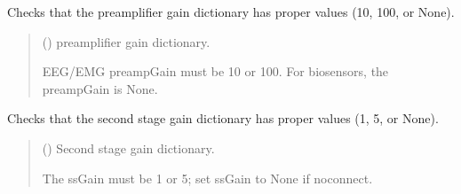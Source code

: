 \documentclass[letterpaper,10pt,english]{sphinxmanual}
\begin{document}
\begin{fulllineitems}
\begin{fulllineitems}
\label{\detokenize{Morelia.Devices:Morelia.Devices.PodDevice_8401HR.Pod8401HR._ValidatePreampGain}}
\pysigstartsignatures
{}
\pysigstopsignatures
\sphinxAtStartPar
Checks that the preamplifier gain dictionary has proper values (10, 100, or None).
\begin{quote}\begin{description}
\sphinxAtStartPar
{} () \textendash{} preamplifier gain dictionary.

\sphinxAtStartPar
{} \textendash{} EEG/EMG preampGain must be 10 or 100. For biosensors, the preampGain is None.

\end{description}\end{quote}

\end{fulllineitems}


\begin{fulllineitems}
\label{\detokenize{Morelia.Devices:Morelia.Devices.PodDevice_8401HR.Pod8401HR._ValidateSsGain}}
\pysigstartsignatures
{}
\pysigstopsignatures
\sphinxAtStartPar
Checks that the second stage gain dictionary has proper values (1, 5, or None).
\begin{quote}\begin{description}
\sphinxAtStartPar
{} () \textendash{} Second stage gain dictionary.

\sphinxAtStartPar
{} \textendash{} The ssGain must be 1 or 5; set ssGain to None if no\sphinxhyphen{}connect.


\end{description}
\end{quote}
\end{fulllineitems}
\end{fulllineitems}
\end{document}
